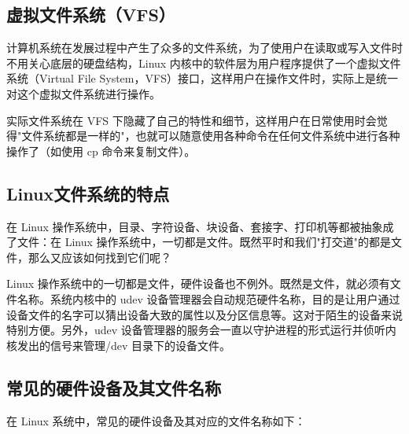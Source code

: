 \documentclass[12pt,UTF8]{ctexbook}
\begin{document}
\subsection{虚拟文件系统（VFS）}

计算机系统在发展过程中产生了众多的文件系统，为了使用户在读取或写入文件时不用关心底层的硬盘结构，Linux 内核中的软件层为用户程序提供了一个虚拟文件系统（Virtual File System，VFS）接口，这样用户在操作文件时，实际上是统一对这个虚拟文件系统进行操作。

实际文件系统在 VFS 下隐藏了自己的特性和细节，这样用户在日常使用时会觉得"文件系统都是一样的"，也就可以随意使用各种命令在任何文件系统中进行各种操作了（如使用 cp 命令来复制文件）。

\subsection{Linux文件系统的特点}

在 Linux 操作系统中，目录、字符设备、块设备、套接字、打印机等都被抽象成了文件：在 Linux 操作系统中，一切都是文件。既然平时和我们"打交道"的都是文件，那么又应该如何找到它们呢？

Linux 操作系统中的一切都是文件，硬件设备也不例外。既然是文件，就必须有文件名称。系统内核中的 udev 设备管理器会自动规范硬件名称，目的是让用户通过设备文件的名字可以猜出设备大致的属性以及分区信息等。这对于陌生的设备来说特别方便。另外，udev 设备管理器的服务会一直以守护进程的形式运行并侦听内核发出的信号来管理/dev 目录下的设备文件。

\subsection{常见的硬件设备及其文件名称}
在 Linux 系统中，常见的硬件设备及其对应的文件名称如下：
\end{document}
